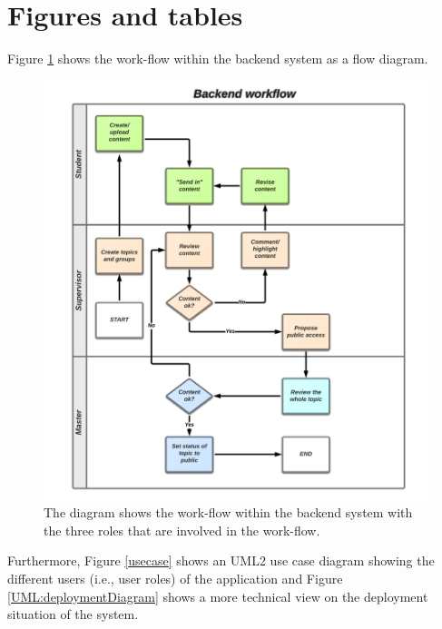 \section{Figures and tables}
Figure \ref{workflow_backend} shows the work-flow within the backend system as a flow diagram.

\begin{figure}[ht]
\centerline{\includegraphics[width=1.3\textwidth]{gfx/HiP-Backend-Workflow}}
\caption{The diagram shows the work-flow within the backend system with the three roles that are involved in the work-flow.}
\label{workflow_backend}
\end{figure}

Furthermore, Figure \ref{usecase} shows an \ac{UML2} use case diagram showing the different users (i.e., user roles) of the application and Figure \ref{UML:deploymentDiagram} shows a more technical view on the deployment situation of the system.

